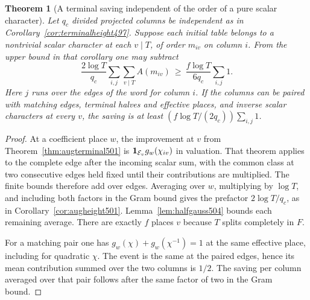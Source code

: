 \documentclass[a4paper,11pt]{article}
\newtheorem{theorem}[proposition]{Theorem}
\theoremstyle{definition}
\theoremstyle{remark}
\numberwithin{equation}{section}
\begin{document}
\begin{theorem}[A terminal saving independent of the order of a pure scalar character]\leavevmode
\label{thm:meangauss504}
Let \(q_c\) divided projected columns be independent as in
Corollary~\ref{cor:terminalheight497}. Suppose each initial
table belongs to a nontrivial scalar character at each \(v\mid T\),
of order \(m_{iv}\) on column \(i\).
From the upper bound in that corollary one may subtract
\[
   \frac{2\log T}{q_c}\sum_{i,j}\sum_{v\mid T} A(m_{iv})
           \ \ge\ \frac{f\log T}{6q_c}\sum_{i,j}1 .
\]
Here \(j\) runs over the edges of the word for column \(i\).
If the columns can be paired with matching edges, terminal halves
and effective places, and inverse scalar characters at every \(v\),
the saving is at
least \((f\log T/(2q_c))\sum_{i,j}1\).
\end{theorem}
\begin{proof}
At a coefficient place \(w\), the improvement at \(v\) from
Theorem~\ref{thm:augterminal501} is
\({\bf1}_{\mathcal E_v}g_w(\chi_{iv})\) in valuation. That
theorem applies to the complete edge after the incoming scalar
sum, with the common class at two consecutive edges held fixed
until their contributions are multiplied. The finite bounds
therefore add over edges. Averaging over \(w\), multiplying by
\(\log T\), and including both factors in the Gram bound gives
the prefactor \(2\log T/q_c\), as in
Corollary~\ref{cor:augheight501}. Lemma~\ref{lem:halfgauss504}
bounds each remaining average. There are exactly \(f\) places
\(v\) because \(T\) splits completely in \(F\).

For a matching pair one has \(g_w(\chi)+g_w(\chi^{-1})=1\)
at the same effective place, including for quadratic \(\chi\).
The event is the same at the paired edges, hence its mean
contribution summed over the two columns is \(1/2\).
The saving per column averaged over that pair follows after
the same factor of two in the Gram bound.
\end{proof}
\end{document}
